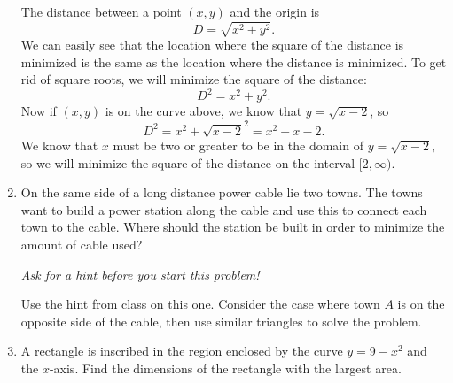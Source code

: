 \documentclass[11pt]{article}
\begin{document}
\begin{enumerate}
  \vfill
  {\color{blue}

    The distance between a point $(x,y)$ and the origin is
    \[
    D = \sqrt{x^2+y^2}.
    \]
    We can easily see that the location where the square of the
    distance is minimized is the same as the location where the
    distance is minimized.  To get rid of square roots, we will
    minimize the square of the distance:
    \[
    D^2=x^2+y^2.
    \]
    Now if $(x,y)$ is on the curve above, we know that $y=\sqrt{x-2}$,
    so
    \[
    D^2 = x^2+\sqrt{x-2}^2 = x^2+x-2.
    \]
    We know that $x$ must be two or greater to be in the domain of
    $y=\sqrt{x-2}$, so we will minimize the square of the distance on
    the interval $[2,\infty)$.


  }
  \vfill

  \newpage

\item On the same side of a long distance power cable lie two towns.
  The towns want to build a power station along the cable and use this
  to connect each town to the cable.  Where should the station be
  built in order to minimize the amount of cable used?

  \vfill
  
  \begin{center}

    \textit{Ask for a hint before you start this problem!}
  \end{center}
  \vfill
  {\color{blue}

    Use the hint from class on this one.  Consider the case where town
    $A$ is on the opposite side of the cable, then use similar
    triangles to solve the problem.

  }
  \vfill


  \newpage

\item A rectangle is inscribed in the region enclosed by the curve
  $y=9-x^2$ and the $x$-axis.  Find the dimensions of the rectangle
  with the largest area.


\end{enumerate}
\end{document}
